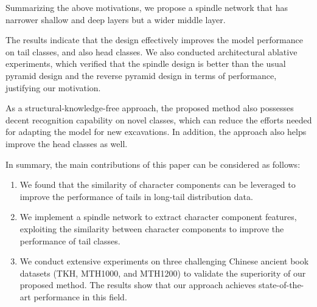 Summarizing the above motivations, we propose a spindle network that has narrower shallow and deep layers but a wider middle layer. 

The results indicate that the design effectively improves the model performance on tail classes, and also head classes.  
We also conducted architectural ablative experiments, which verified that the spindle design is better than the usual pyramid design and the reverse pyramid design in terms of performance, justifying our motivation.

As a structural-knowledge-free approach, the proposed method also possesses decent recognition capability on novel classes, which can reduce the efforts needed for adapting the model for new excavations. In addition, the approach also helps improve the head classes as well. 

In summary, the main contributions of this paper can be considered as follows:
\begin{enumerate}[noitemsep]
\item We found that the similarity of character components can be leveraged to improve the performance of tails in long-tail distribution data.
\item We implement a spindle network to extract character component features, exploiting the similarity between character components to improve the performance of tail classes.
\item We conduct extensive experiments on three challenging Chinese ancient book datasets (TKH, MTH1000, and MTH1200) to validate the superiority of our proposed method. The results show that our approach achieves state-of-the-art performance in this field.
\end{enumerate}

